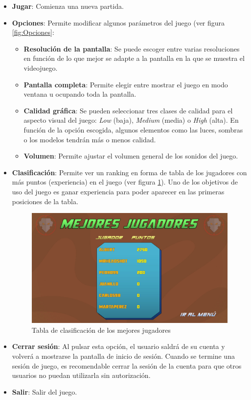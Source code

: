\begin{itemize}
    \item \textbf{Jugar}: Comienza una nueva partida.
    \item \textbf{Opciones}: Permite modificar algunos parámetros del juego (ver figura \ref{fig:Opciones}:
    \begin{itemize}
    \item \textbf{Resolución de la pantalla}: Se puede escoger entre varias resoluciones en función de lo que mejor se adapte a la pantalla en la que se muestra el videojuego.
    \item \textbf{Pantalla completa}: Permite elegir entre mostrar el juego en modo ventana u ocupando toda la pantalla.
    \item \textbf{Calidad gráfica}: Se pueden seleccionar tres clases de calidad para el aspecto visual del juego: \textit{Low} (baja), \textit{Medium} (media) o \textit{High} (alta). En función de la opción escogida, algunos elementos como las luces, sombras o los modelos tendrán más o menos calidad.
     \item \textbf{Volumen}: Permite ajustar el volumen general de los sonidos del juego.
    \end{itemize}
    \item \textbf{Clasificación}: Permite ver un ranking en forma de tabla de los jugadores con más puntos (experiencia) en el juego (ver figura \ref{fig:ClasificacionJugadores}). Uno de los objetivos de uso del juego es ganar experiencia para poder aparecer en las primeras posiciones de la tabla.
    
    \begin{figure}[h]
    \centering
    \includegraphics[scale=0.45]{img/RankingScreen.jpg}
    \caption{Tabla de clasificación de los mejores jugadores}
    \label{fig:ClasificacionJugadores}
    \end{figure}
    
    \item \textbf{Cerrar sesión}: Al pulsar esta opción, el usuario saldrá de su cuenta y volverá a mostrarse la pantalla de inicio de sesión. Cuando se termine una sesión de juego, es recomendable cerrar la sesión de la cuenta para que otros usuarios no puedan utilizarla sin autorización.
    \item \textbf{Salir}: Salir del juego.
\end{itemize}

